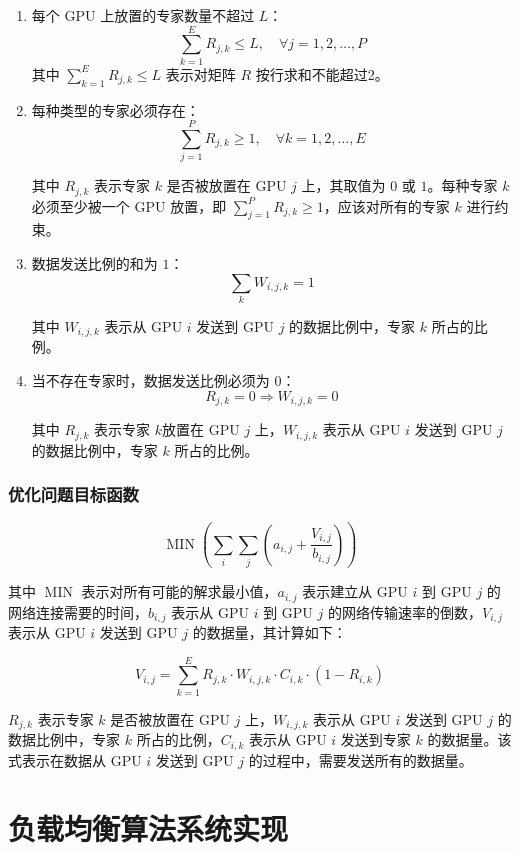 \begin{enumerate}

    \item  每个 GPU 上放置的专家数量不超过 $L$：
$$\sum_{k=1}^{E} R_{j,k} \leq L, \quad \forall j=1,2,\ldots,P$$
其中 $\sum_{k=1}^{E} R_{j,k} \leq L$ 表示对矩阵 $R$ 按行求和不能超过2。

\item 每种类型的专家必须存在：
$$\sum_{j=1}^{P} R_{j,k} \geq 1, \quad \forall k=1,2,\ldots,E$$

其中 $R_{j,k}$ 表示专家 $k$ 是否被放置在 GPU $j$ 上，其取值为 $0$ 或 $1$。每种专家 $k$ 必须至少被一个 GPU 放置，即 $\sum_{j=1}^{P} R_{j,k} \geq 1$，应该对所有的专家 $k$ 进行约束。

\item 数据发送比例的和为 $1$：
$$\sum_k W_{i,j,k} = 1$$

其中 $W_{i,j,k}$ 表示从 GPU $i$ 发送到 GPU $j$ 的数据比例中，专家 $k$ 所占的比例。

\item 当不存在专家时，数据发送比例必须为 $0$：
$$R_{j,k} = 0 \Rightarrow W_{i,j,k} = 0$$

其中 $R_{j,k}$ 表示专家 $k$放置在 GPU $j$ 上，$W_{i,j,k}$ 表示从 GPU $i$ 发送到 GPU $j$ 的数据比例中，专家 $k$ 所占的比例。
\end{enumerate}

\subsubsection{优化问题目标函数}



$$  \operatorname{MIN} \left( \sum_i \sum_j \left( a_{i,j} + \frac{V_{i,j}}{b_{i,j}} \right) \right)$$

其中 $\operatorname{MIN}$ 表示对所有可能的解求最小值，$a_{i,j}$ 表示建立从 GPU $i$ 到 GPU $j$ 的网络连接需要的时间，$b_{i,j}$ 表示从 GPU $i$ 到 GPU $j$ 的网络传输速率的倒数，$V_{i,j}$ 表示从 GPU $i$ 发送到 GPU $j$ 的数据量，其计算如下：

$$V_{i,j} = \sum_{k=1}^{E} R_{j,k} \cdot W_{i,j,k} \cdot C_{i,k} \cdot \left(1-R_{i,k}\right)$$

$R_{j,k}$ 表示专家 $k$ 是否被放置在 GPU $j$ 上，$W_{i,j,k}$ 表示从 GPU $i$ 发送到 GPU $j$ 的数据比例中，专家 $k$ 所占的比例，$C_{i,k}$ 表示从 GPU $i$ 发送到专家 $k$ 的数据量。该式表示在数据从 GPU $i$ 发送到 GPU $j$ 的过程中，需要发送所有的数据量。

\section{负载均衡算法系统实现}

